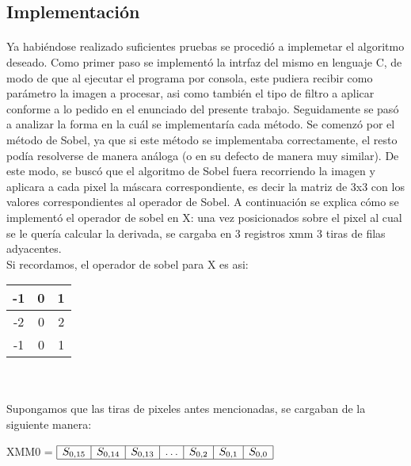 \documentclass[11pt, a4paper]{article}
\begin{document}
\subsection{Implementaci\'on}
\paragraph*{}
Ya habi\'endose realizado suficientes pruebas se procedi\'o a implemetar el algoritmo deseado. Como primer paso se implement\'o la intrfaz del mismo en lenguaje C, de modo de que al ejecutar el programa por consola, este pudiera recibir como par\'ametro la imagen a procesar, asi como tambi\'en el tipo de filtro a aplicar conforme a lo pedido en el enunciado del presente trabajo.
Seguidamente se pas\'o a analizar la forma en la cu\'al se implementar\'ia cada m\'etodo. Se comenz\'o por el m\'etodo de Sobel, ya que si este m\'etodo se implementaba correctamente, el resto pod\'ia resolverse de manera an\'aloga (o en su defecto de manera muy similar).
De este modo, se busc\'o que el algoritmo de Sobel fuera recorriendo la imagen y aplicara a cada pixel la m\'ascara correspondiente, es decir la matriz de 3x3 con los valores correspondientes al operador de Sobel. A continuaci\'on se explica c\'omo se implement\'o el operador de sobel en X: una vez posicionados sobre el pixel al cual se le quer\'ia calcular la derivada, se cargaba en 3 registros xmm 3 tiras de filas adyacentes.\\
Si recordamos, el operador de sobel para X es asi:\\
\begin{table}[h]
\centering
\begin{tabular}{|c|c|c|}
\hline -1 & 0 & 1 \\ 
\hline -2 & 0 & 2 \\ 
\hline -1 & 0 & 1 \\ 
\hline 
\end{tabular}
\end{table}\\

\paragraph{}
Supongamos que las tiras de pixeles antes mencionadas, se cargaban de la siguiente manera:\\

\begin{center}
XMM0 = $\begin{array}{|c|c|c|c|c|c|c|}
\hline
S_{0,15} & S_{0,14} & S_{0,13} & \ldots & S_{0,2} & S_{0,1} & S_{0,0}\\
\hline
\end{array} $
\end{center}
\end{document}
